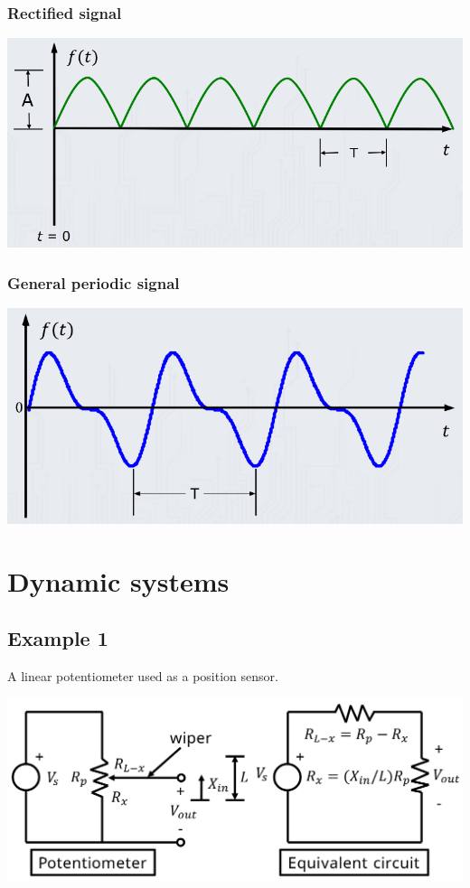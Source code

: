 \documentclass[11pt]{article}
\begin{document}
\subsubsection{Rectified signal}
\label{sec:org9922dc4}
\begin{center}
\includegraphics[width=.9\linewidth]{./images/rectified-signal.png}
\end{center}
\subsubsection{General periodic signal}
\label{sec:orgc7f7d73}
\begin{center}
\includegraphics[width=.9\linewidth]{./images/general-periodic-signal.png}
\end{center}

 \newpage
\section{Dynamic systems}
\label{sec:org27f3c9e}

\subsection{Example 1}
\label{sec:org599138f}
A linear potentiometer used as a position sensor.
\begin{center}
\includegraphics[width=.9\linewidth]{./images/linear-potentiometer-used-as-position-sensor.png}
\end{center}
\end{document}
